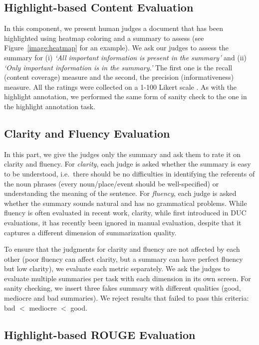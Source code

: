 \documentclass[11pt,a4paper]{article}
\begin{document}
\subsection{Highlight-based Content Evaluation}
In this component, we present human judges a document that has been highlighted using heatmap coloring and a summary to assess (see Figure~\ref{image:heatmap} for an example). We ask our judges to assess the summary for (i) \textit{`All important information is present in the summary'} and (ii) \textit{`Only important information is in the summary.'} The first one is the recall (content coverage) measure and the second, the precision (informativeness) measure. All the ratings were collected on a 1-100 Likert scale \citep{Likert1932}.
As with the highlight annotation, %
we performed the same form of sanity check to the one in the highlight annotation task.


\subsection{Clarity and Fluency Evaluation}
In this part, we give the judges only the summary and ask them to rate it on clarity and fluency. For {\em clarity}, each judge is asked whether the summary is easy to be understood, i.e.\ 
there should be no difficulties in identifying the referents of the noun phrases (every noun/place/event should be well-specified) or understanding the meaning of the sentence. For {\em fluency}, each judge is asked whether the summary sounds natural and has no grammatical problems. %
While fluency is often evaluated in recent work, clarity, while first introduced in DUC evaluations, it has recently been ignored in manual evaluation, despite that it captures a different dimension of summarization quality.

To ensure that the judgments for clarity and fluency are not affected by each other (poor fluency can affect clarity, but a summary can have perfect fluency but low clarity), %
we evaluate each metric separately. We ask the judges to evaluate multiple summaries per task with each dimension in its own screen. For sanity checking, we insert three fakes summary with different qualities (good, mediocre and bad summaries). We reject results that failed to pass this criteria: bad $<$ mediocre $<$ good.

\subsection{Highlight-based ROUGE Evaluation} 
\label{subsec:hrouge}
\end{document}
